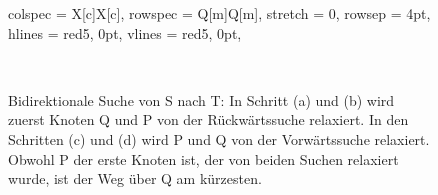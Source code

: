 \begin{figure}[H]
\begin{tblr}{
        colspec = {X[c]X[c]},
        rowspec = {Q[m]Q[m]},
        stretch = 0,
        rowsep = 4pt,
        hlines = {red5, 0pt},
        vlines = {red5, 0pt},
        }
 \\
    \end{tblr}
    \caption[Bidirektionale Suche von s nach t]{Bidirektionale Suche von S nach T: In Schritt (a) und (b) wird zuerst Knoten Q und P von der
        Rückwärtssuche relaxiert. In den Schritten (c) und (d) wird P und Q von der Vorwärtssuche
        relaxiert. Obwohl P der erste Knoten  ist, der von beiden Suchen relaxiert wurde, ist der
        Weg über Q am kürzesten.}
    \label{fig:bidirectional_dijkstra}
\end{figure}

